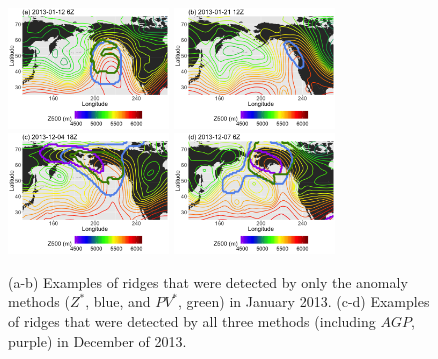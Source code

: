 \documentclass[smallextended]{svjour3}       %
\numberwithin{equation}{section}
\begin{document}
\begin{figure}
\centering
\includegraphics[width=0.38\textwidth]{fig6a}
\includegraphics[width=0.38\textwidth]{fig6b}\\
\includegraphics[width=0.38\textwidth]{fig6c}
\includegraphics[width=0.38\textwidth]{fig6d}
\caption{(a-b) Examples of ridges that were detected by only the anomaly methods ($Z^*$, blue, and $PV^*$, green) in January 2013. (c-d) Examples of ridges that were detected by all three methods (including $AGP$, purple) in December of 2013.}\label{RRRpanel}
\end{figure}
\end{document}

